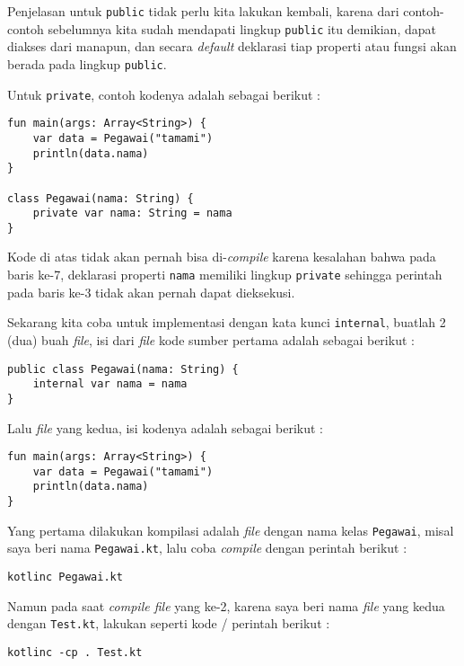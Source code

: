 Penjelasan untuk \texttt{public} tidak perlu kita lakukan kembali, karena dari contoh-contoh sebelumnya kita sudah mendapati lingkup \texttt{public} itu demikian, dapat diakses dari manapun, dan secara \textit{default} deklarasi tiap properti atau fungsi akan berada pada lingkup \texttt{public}.

Untuk \texttt{private}, contoh kodenya adalah sebagai berikut :

\begin{lstlisting}
fun main(args: Array<String>) {
	var data = Pegawai("tamami")
	println(data.nama)
}

class Pegawai(nama: String) {
	private var nama: String = nama
}
\end{lstlisting}

Kode di atas tidak akan pernah bisa di-\textit{compile} karena kesalahan bahwa pada baris ke-7, deklarasi properti \texttt{nama} memiliki lingkup \texttt{private} sehingga perintah pada baris ke-3 tidak akan pernah dapat dieksekusi.

Sekarang kita coba untuk implementasi dengan kata kunci \texttt{internal}, buatlah 2 (dua) buah \textit{file}, isi dari \textit{file} kode sumber pertama adalah sebagai berikut :

\begin{lstlisting}
public class Pegawai(nama: String) {
	internal var nama = nama
}
\end{lstlisting}

Lalu \textit{file} yang kedua, isi kodenya adalah sebagai berikut :

\begin{lstlisting}
fun main(args: Array<String>) {
	var data = Pegawai("tamami")
	println(data.nama)
}
\end{lstlisting}

Yang pertama dilakukan kompilasi adalah \textit{file} dengan nama kelas \texttt{Pegawai}, misal saya beri nama \texttt{Pegawai.kt}, lalu coba \textit{compile} dengan perintah berikut :

\begin{lstlisting}
kotlinc Pegawai.kt
\end{lstlisting}

Namun pada saat \textit{compile file} yang ke-2, karena saya beri nama \textit{file} yang kedua dengan \texttt{Test.kt}, lakukan seperti kode / perintah berikut :

\begin{lstlisting}
kotlinc -cp . Test.kt
\end{lstlisting}


